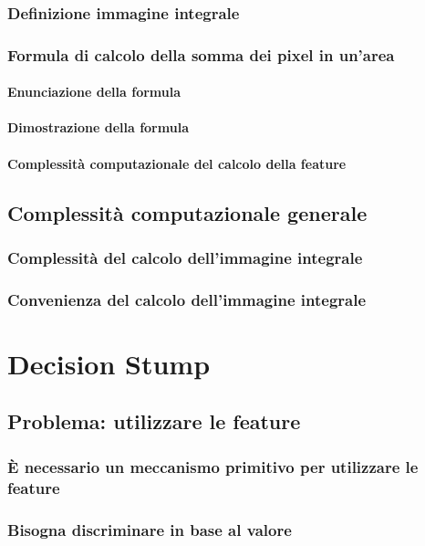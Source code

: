             \subsubsection{Definizione immagine integrale}
            \subsubsection{Formula di calcolo della somma dei pixel in un'area}
                \paragraph{Enunciazione della formula}
                \paragraph{Dimostrazione della formula}
                \paragraph{Complessità computazionale del calcolo della feature}
        \subsection{Complessità computazionale generale}
            \subsubsection{Complessità del calcolo dell'immagine integrale}
            \subsubsection{Convenienza del calcolo dell'immagine integrale}
    \section{Decision Stump}
    \label{sec:decision_stump}
        \subsection{Problema: utilizzare le feature}
            \subsubsection{È necessario un meccanismo primitivo per utilizzare le feature}
            \subsubsection{Bisogna discriminare in base al valore}
